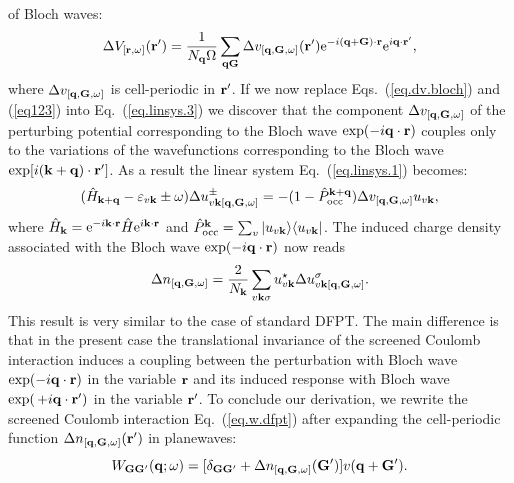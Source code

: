 \documentclass[twocolumn,prb,showpacs,superscriptaddress]{revtex4}
\def\s1{\hspace{0.5cm}}
\def\s2{\hspace{1cm}}
\def\w{\omega}
\def\H{\hat{H}}
\def\P{\hat{P}_{\rm occ}}
\def\E{\varepsilon}
\def\q{{\bf q}}
\def\s{\sigma}
\def\k{{\bf k}}
\def\G{{\bf G}}
\def\Gp{{\bf G^\prime}}
\def\r{{\bf r}}
\def\rp{{\bf r^\prime}}
\begin{document}
of Bloch waves: 
  \begin{equation}\label{eq.dv.bloch}
  \Delta V_{[\r,\w]} (\rp) = \frac{1}{N_\q\Omega}  \sum_{\q\G} \Delta v_{[\q,\G,\w]}(\rp) 
   {\rm e}^{-i(\q+\G)\cdot\r} {\rm e}^{i\q\cdot\rp}, 
  \end{equation}
where $\Delta v_{[\q,\G,\w]}$ is cell-periodic in $\rp$.
If we now replace Eqs.\ (\ref{eq.dv.bloch}) and (\ref{eq123}) into Eq.\ (\ref{eq.linsys.3})
we discover that the component $\Delta v_{[\q,\G,\w]}$ of the
perturbing potential corresponding to the Bloch wave ${\rm exp}(-i\q\cdot\r)$
couples only to the variations of the wavefunctions corresponding to
the Bloch wave ${\rm exp}[i(\k+\q)\cdot\rp]$.
As a result the linear system Eq.\ (\ref{eq.linsys.1}) becomes:
  \begin{equation}\label{eq.linsys.4}
  (\H_{\k+\q}-\E_{v\k}\pm\w) \Delta u^\pm_{v\k[\q,\G,\w]}  = -(1-\P^{\k+\q}) \Delta v_{[\q,\G,\w]} u_{v\k},
  \end{equation}
where $\H_\k= {\rm e}^{-i\k\cdot\r} \H {\rm e}^{i\k\cdot\r}$ and
$\P^\k=\sum_v | u_{v\k} \rangle \langle u_{v\k}|$.
The induced charge density associated with the Bloch wave ${\rm exp}(-i\q\cdot\r)$ 
now reads 
  \begin{equation} \label{eq.deltan.bloch}
  \Delta n_{[\q,\G,\w]} = \frac{2}{N_\k}\sum_{v\k\s} u_{v\k}^\star  \Delta u^\s_{v\k[\q,\G,\w]}.
  \end{equation}
This result is very similar to the case of standard DFPT.\cite{baroni.rmp} 
The main difference is that in the present case the translational invariance 
of the screened Coulomb interaction induces a coupling between the perturbation 
with Bloch wave ${\rm exp}(-i\q\cdot\r)$ in the variable $\r$ and its induced
response with Bloch wave ${\rm exp}(\,+i\q\cdot\rp)$ in the variable $\rp$.
%
To conclude our derivation, we rewrite the screened Coulomb interaction 
Eq.\ (\ref{eq.w.dfpt}) after expanding the cell-periodic function 
$\Delta n_{[\q,\G,\w]}(\rp)$ in planewaves:
  \begin{equation}\label{eq.w.deltan.g}
  W_{\G\Gp}(\q;\w) = [\delta_{\G\Gp} + \Delta n_{[\q,\G,\w]}(\Gp) ]v(\q+\Gp).
  \end{equation}
\end{document}
